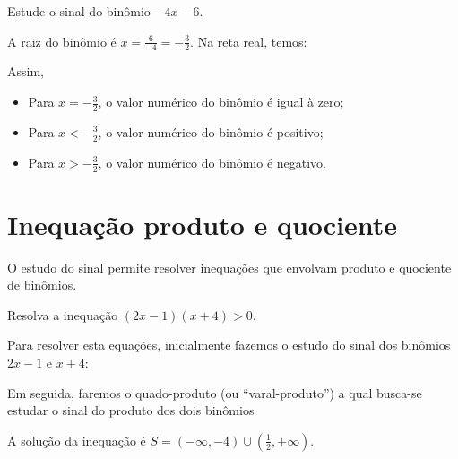 \begin{exem}
    Estude o sinal do binômio $-4x-6$.

    A raiz do binômio é $x=\frac{6}{-4}=-\frac{3}{2}$. Na reta real, temos:
    \begin{signtbl}{1}{1}
    \end{signtbl} 

    Assim,
    \begin{itemize}
        \item Para $x=-\frac{3}{2}$, o valor numérico do binômio é igual à zero;
        \item Para $x<-\frac{3}{2}$, o valor numérico do binômio é positivo;
        \item Para $x>-\frac{3}{2}$, o valor numérico do binômio é negativo.
    \end{itemize}
\end{exem}


\section{Inequação produto e quociente}

O estudo do sinal permite resolver inequações que envolvam produto e quociente de binômios.

\begin{exem}
    Resolva a inequação $(2x-1)(x+4)>0$.

    Para resolver esta equações, inicialmente fazemos o estudo do sinal dos binômios $2x-1$ e $x+4$:
    \begin{signtbl}{1}{1}
    \end{signtbl}
    \begin{signtbl}{1}{1}
    \end{signtbl}

    Em seguida, faremos o quado-produto (ou ``varal-produto'') a qual busca-se estudar o sinal do produto dos dois binômios

    \begin{signtbl}{3}{2}
    \end{signtbl}

    A solução da inequação é $S=(-\infty,-4)\cup(\frac{1}{2},+\infty)$.
\end{exem}

